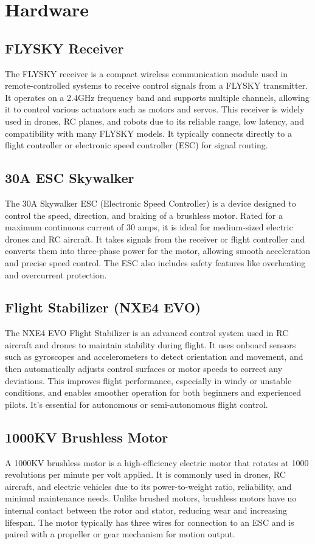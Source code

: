 \section{Hardware}
\subsection{FLYSKY Receiver}
The FLYSKY receiver is a compact wireless communication module used in remote-controlled systems to receive control signals from a FLYSKY transmitter. It operates on a 2.4GHz frequency band and supports multiple channels, allowing it to control various actuators such as motors and servos. This receiver is widely used in drones, RC planes, and robots due to its reliable range, low latency, and compatibility with many FLYSKY models. It typically connects directly to a flight controller or electronic speed controller (ESC) for signal routing.

\subsection{30A ESC Skywalker}
The 30A Skywalker ESC (Electronic Speed Controller) is a device designed to control the speed, direction, and braking of a brushless motor. Rated for a maximum continuous current of 30 amps, it is ideal for medium-sized electric drones and RC aircraft. It takes signals from the receiver or flight controller and converts them into three-phase power for the motor, allowing smooth acceleration and precise speed control. The ESC also includes safety features like overheating and overcurrent protection.

\subsection{Flight Stabilizer (NXE4 EVO)}
The NXE4 EVO Flight Stabilizer is an advanced control system used in RC aircraft and drones to maintain stability during flight. It uses onboard sensors such as gyroscopes and accelerometers to detect orientation and movement, and then automatically adjusts control surfaces or motor speeds to correct any deviations. This improves flight performance, especially in windy or unstable conditions, and enables smoother operation for both beginners and experienced pilots. It's essential for autonomous or semi-autonomous flight control.

\subsection{1000KV Brushless Motor}
A 1000KV brushless motor is a high-efficiency electric motor that rotates at 1000 revolutions per minute per volt applied. It is commonly used in drones, RC aircraft, and electric vehicles due to its power-to-weight ratio, reliability, and minimal maintenance needs. Unlike brushed motors, brushless motors have no internal contact between the rotor and stator, reducing wear and increasing lifespan. The motor typically has three wires for connection to an ESC and is paired with a propeller or gear mechanism for motion output.

